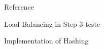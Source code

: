 \documentclass[18pt]{beamer}
\begin{document}
\appendix
\beginbackup


\nocite{major}
\nocite{dietzfelbinger1997reliable}
\nocite{fortune1978note}
\nocite{chap13}
\nocite{web}
\nocite{khuller1995simple}
\nocite{Bentley:1976:DMS:800113.803652}

\begin{frame}[allowframebreaks]{Reference}
\printbibliography
\end{frame}


\begin{frame}{Load Balancing in Step 3}
testc
\end{frame}

\begin{frame}{Implementation of Hashing}

\end{frame}


\backupend
\end{document}
